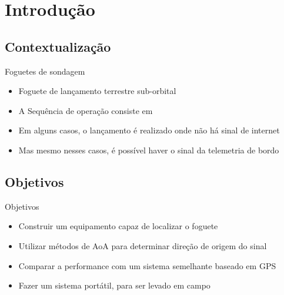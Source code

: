 \section{Introdução}

\subsection{Contextualização}

\begin{frame}{Foguetes de sondagem}
    \begin{itemize}[<+->]
        \item Foguete de lançamento terrestre sub-orbital
        \item A Sequência de operação consiste em 
        \item Em alguns casos, o lançamento é realizado onde não há sinal de internet
        \item Mas mesmo nesses casos, é possível haver o sinal da telemetria de bordo
    \end{itemize}
\end{frame}

\subsection{Objetivos}
\begin{frame}{Objetivos}
    \begin{itemize}[<+->]
        \item Construir um equipamento capaz de localizar o foguete
        \item Utilizar métodos de AoA para determinar direção de origem do sinal
        \item Comparar a performance com um sistema semelhante baseado em GPS
        \item Fazer um sistema portátil, para ser levado em campo
    \end{itemize}
\end{frame}

\subsection{}